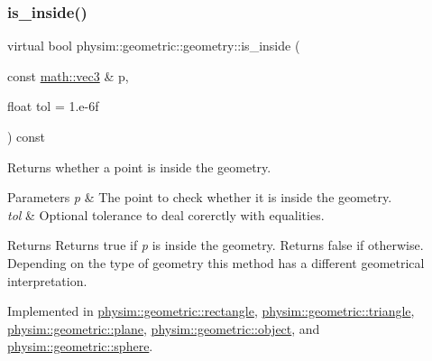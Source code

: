 \subsubsection{\texorpdfstring{is\+\_\+inside()}{is\_inside()}}
{\footnotesize\ttfamily virtual bool physim\+::geometric\+::geometry\+::is\+\_\+inside (\begin{DoxyParamCaption}\item[{const \hyperlink{structphysim_1_1math_1_1vec3}{math\+::vec3} \&}]{p,  }\item[{float}]{tol = {\ttfamily 1.e-\/6f} }\end{DoxyParamCaption}) const\hspace{0.3cm}{\ttfamily [pure virtual]}}



Returns whether a point is inside the geometry. 


\begin{DoxyParams}{Parameters}
{\em p} & The point to check whether it is inside the geometry. \\
\hline
{\em tol} & Optional tolerance to deal corerctly with equalities. \\
\hline
\end{DoxyParams}
\begin{DoxyReturn}{Returns}
Returns true if {\itshape p} is inside the geometry. Returns false if otherwise. Depending on the type of geometry this method has a different geometrical interpretation. 
\end{DoxyReturn}


Implemented in \hyperlink{classphysim_1_1geometric_1_1rectangle_ab36400ef3f750fb6482fda8e1044bfa5}{physim\+::geometric\+::rectangle}, \hyperlink{classphysim_1_1geometric_1_1triangle_a735cfae7db71f5d6105011c40595ca37}{physim\+::geometric\+::triangle}, \hyperlink{classphysim_1_1geometric_1_1plane_a873ac41caf2d1ed4b9f8e52502ecbd92}{physim\+::geometric\+::plane}, \hyperlink{classphysim_1_1geometric_1_1object_ade3bdbcb865c6b0910b8adfe2225be9b}{physim\+::geometric\+::object}, and \hyperlink{classphysim_1_1geometric_1_1sphere_a22ca74b7056f85165d80d9913b32bbfb}{physim\+::geometric\+::sphere}.

\mbox{\label{classphysim_1_1geometric_1_1geometry_a5b029b5fa8e55847d5aa06b1d341c88c}} 
